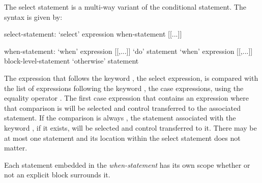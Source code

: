 
The select statement is a multi-way variant of the conditional
statement.  The syntax is given by:
\begin{syntax}
select-statement:
  `select' expression { when-statement [[...]] }

when-statement:
  `when' expression [[,...]] `do' statement
  `when' expression [[,...]] block-level-statement
  `otherwise' statement
\end{syntax}
The expression that follows the keyword , the select
expression, is compared with the list of expressions following the keyword 
, the case expressions, using the equality operator \chpl{==}.
The first case expression that contains an expression where that
comparison is  will be selected and control transferred to
the associated statement.  If the comparison is always ,
the statement associated with the keyword , if it
exists, will be selected and control transferred to it.  There may be
at most one  statement and its location within the
select statement does not matter.

Each statement embedded in the {\em when-statement} has its own scope
whether or not an explicit block surrounds it.
